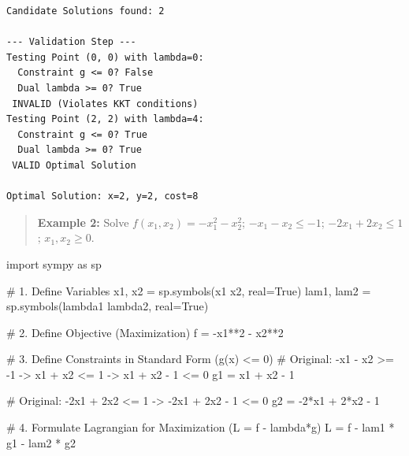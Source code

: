 \documentclass[
  letterpaper,
  DIV=11,
  numbers=noendperiod]{scrreprt}
\newenvironment{Shaded}{\begin{snugshade}}{\end{snugshade}}
\newcommand{\CommentTok}[1]{\textcolor[rgb]{0.37,0.37,0.37}{#1}}
\newcommand{\DecValTok}[1]{\textcolor[rgb]{0.68,0.00,0.00}{#1}}
\newcommand{\ImportTok}[1]{\textcolor[rgb]{0.00,0.46,0.62}{#1}}
\newcommand{\NormalTok}[1]{\textcolor[rgb]{0.00,0.23,0.31}{#1}}
\newcommand{\OperatorTok}[1]{\textcolor[rgb]{0.37,0.37,0.37}{#1}}
\newcommand{\StringTok}[1]{\textcolor[rgb]{0.13,0.47,0.30}{#1}}
\newcommand{\VariableTok}[1]{\textcolor[rgb]{0.07,0.07,0.07}{#1}}
\begin{document}
\begin{verbatim}
Candidate Solutions found: 2

--- Validation Step ---
Testing Point (0, 0) with lambda=0:
  Constraint g <= 0? False
  Dual lambda >= 0? True
 INVALID (Violates KKT conditions)
Testing Point (2, 2) with lambda=4:
  Constraint g <= 0? True
  Dual lambda >= 0? True
 VALID Optimal Solution

Optimal Solution: x=2, y=2, cost=8
\end{verbatim}

\begin{quote}
\textbf{Example 2:} Solve \(f(x_1,x_2)=-x_1^2-x_2^2\);
\(-x_1-x_2\le -1\); \(-2x_1+2x_2\le 1\); \(x_1,x_2\ge 0\).
\end{quote}

\begin{Shaded}
\begin{Highlighting}[]
\ImportTok{import}\NormalTok{ sympy }\ImportTok{as}\NormalTok{ sp}

\CommentTok{\# 1. Define Variables}
\NormalTok{x1, x2 }\OperatorTok{=}\NormalTok{ sp.symbols(}\StringTok{\textquotesingle{}x1 x2\textquotesingle{}}\NormalTok{, real}\OperatorTok{=}\VariableTok{True}\NormalTok{)}
\NormalTok{lam1, lam2 }\OperatorTok{=}\NormalTok{ sp.symbols(}\StringTok{\textquotesingle{}lambda1 lambda2\textquotesingle{}}\NormalTok{, real}\OperatorTok{=}\VariableTok{True}\NormalTok{)}

\CommentTok{\# 2. Define Objective (Maximization)}
\NormalTok{f }\OperatorTok{=} \OperatorTok{{-}}\NormalTok{x1}\OperatorTok{**}\DecValTok{2} \OperatorTok{{-}}\NormalTok{ x2}\OperatorTok{**}\DecValTok{2}

\CommentTok{\# 3. Define Constraints in Standard Form (g(x) \textless{}= 0)}
\CommentTok{\# Original: {-}x1 {-} x2 \textgreater{}= {-}1  {-}\textgreater{} x1 + x2 \textless{}= 1 {-}\textgreater{} x1 + x2 {-} 1 \textless{}= 0}
\NormalTok{g1 }\OperatorTok{=}\NormalTok{ x1 }\OperatorTok{+}\NormalTok{ x2 }\OperatorTok{{-}} \DecValTok{1}

\CommentTok{\# Original: {-}2x1 + 2x2 \textless{}= 1 {-}\textgreater{} {-}2x1 + 2x2 {-} 1 \textless{}= 0}
\NormalTok{g2 }\OperatorTok{=} \OperatorTok{{-}}\DecValTok{2}\OperatorTok{*}\NormalTok{x1 }\OperatorTok{+} \DecValTok{2}\OperatorTok{*}\NormalTok{x2 }\OperatorTok{{-}} \DecValTok{1}

\CommentTok{\# 4. Formulate Lagrangian for Maximization (L = f {-} lambda*g)}
\NormalTok{L }\OperatorTok{=}\NormalTok{ f }\OperatorTok{{-}}\NormalTok{ lam1 }\OperatorTok{*}\NormalTok{ g1 }\OperatorTok{{-}}\NormalTok{ lam2 }\OperatorTok{*}\NormalTok{ g2}


\end{Highlighting}
\end{Shaded}
\end{document}
